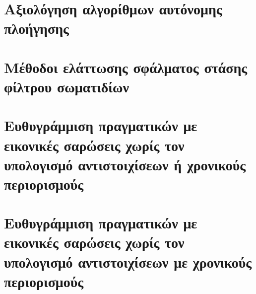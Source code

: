 \chapter{Αξιολόγηση αλγορίθμων αυτόνομης πλοήγησης}
  \label{appendix:01}
  

\chapter{Μέθοδοι ελάττωσης σφάλματος στάσης φίλτρου σωματιδίων}
  \label{appendix:02}
  

\chapter{Ευθυγράμμιση πραγματικών με εικονικές σαρώσεις χωρίς τον υπολογισμό αντιστοιχίσεων ή χρονικούς περιορισμούς}
  \label{appendix:03}
  

\chapter{Ευθυγράμμιση πραγματικών με εικονικές σαρώσεις χωρίς τον υπολογισμό αντιστοιχίσεων με χρονικούς περιορισμούς}
  \label{appendix:04}
  

